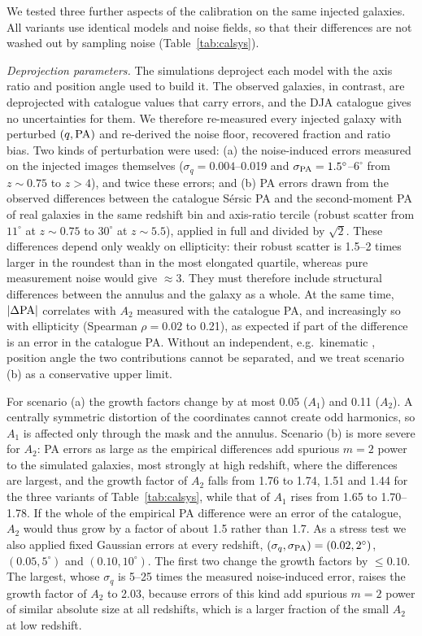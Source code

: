 \documentclass[fleqn,usenatbib]{mnras}
\begin{document}
We tested three further aspects of the calibration on the same injected
galaxies. All variants use identical models and noise fields, so that their
differences are not washed out by sampling noise (Table~\ref{tab:calsys}).

\textit{Deprojection parameters.} The simulations deproject each model with the
axis ratio and position angle used to build it. The observed galaxies, in
contrast, are deprojected with catalogue values that carry errors, and the DJA
catalogue gives no uncertainties for them. We therefore re-measured every
injected galaxy with perturbed $(q,{\rm PA})$ and re-derived the noise floor,
recovered fraction and ratio bias. Two kinds of perturbation were used: (a) the
noise-induced errors measured on the injected images themselves
($\sigma_q=0.004$--0.019 and $\sigma_{\rm PA}=1.5^\circ$--$6^\circ$ from
$z\sim0.75$ to $z>4$), and twice these errors; and (b) PA errors drawn from the
observed differences between the catalogue S\'ersic PA and the second-moment PA
of real galaxies in the same redshift bin and axis-ratio tercile (robust scatter
from $11^\circ$ at $z\sim0.75$ to $30^\circ$ at $z\sim5.5$), applied in full and
divided by $\sqrt2$. These differences depend only weakly on ellipticity: their
robust scatter is 1.5--2 times larger in the roundest than in the most elongated
quartile, whereas pure measurement noise would give $\approx3$. They must
therefore include structural differences between the annulus and the galaxy as a
whole. At the same time, $|\Delta{\rm PA}|$ correlates with $A_2$ measured with
the catalogue PA, and increasingly so with ellipticity (Spearman $\rho=0.02$ to
0.21), as expected if part of the difference is an error in the catalogue PA.
Without an independent, e.g.\ kinematic \citep{Wisnioski2015}, position angle
the two contributions cannot be separated, and we treat scenario (b) as a
conservative upper limit.

For scenario (a) the growth factors change by at most 0.05 ($A_1$) and 0.11
($A_2$). A centrally symmetric distortion of the coordinates cannot create odd
harmonics, so $A_1$ is affected only through the mask and the annulus. Scenario
(b) is more severe for $A_2$: PA errors as large as the empirical differences
add spurious $m=2$ power to the simulated galaxies, most strongly at high
redshift, where the differences are largest, and the growth factor of $A_2$ falls
from 1.76 to 1.74, 1.51 and 1.44 for the three variants of
Table~\ref{tab:calsys}, while that of $A_1$ rises from 1.65 to 1.70--1.78. If the
whole of the empirical PA difference were an error of the catalogue, $A_2$ would
thus grow by a factor of about 1.5 rather than 1.7. As a stress test we also
applied fixed Gaussian errors at every redshift,
$(\sigma_q,\sigma_{\rm PA})=(0.02,2^\circ)$, $(0.05,5^\circ)$ and
$(0.10,10^\circ)$. The first two change the growth factors by $\leq0.10$. The
largest, whose $\sigma_q$ is 5--25 times the measured noise-induced error, raises
the growth factor of $A_2$ to 2.03, because errors of this kind add spurious
$m=2$ power of similar absolute size at all redshifts, which is a larger fraction
of the small $A_2$ at low redshift.
\end{document}
